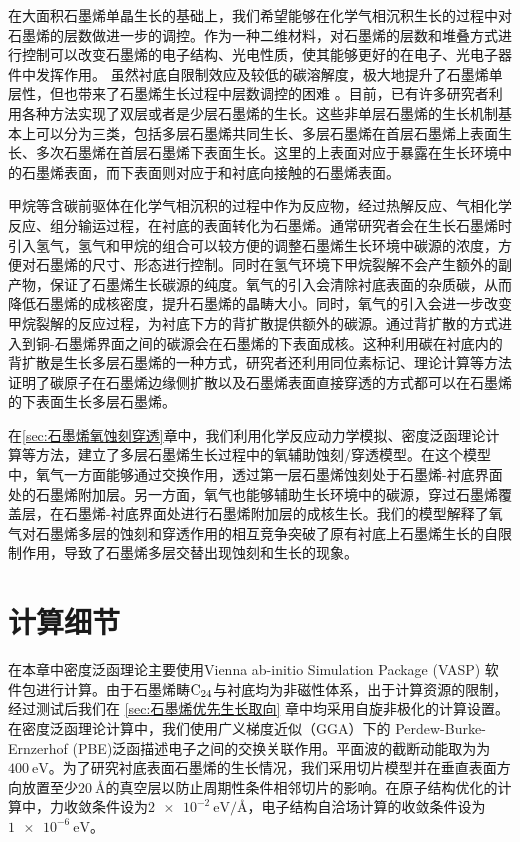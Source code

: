 在大面积石墨烯单晶生长的基础上，我们希望能够在化学气相沉积生长的过程中对石墨烯的层数做进一步的调控。作为一种二维材料，对石墨烯的层数和堆叠方式进行控制可以改变石墨烯的电子结构、光电性质，使其能够更好的在电子、光电子器件中发挥作用。
虽然衬底自限制效应及较低的碳溶解度，极大地提升了石墨烯单层性，但也带来了石墨烯生长过程中层数调控的困难 。目前，已有许多研究者利用各种方法实现了双层或者是少层石墨烯的生长。这些非单层石墨烯的生长机制基本上可以分为三类，包括多层石墨烯共同生长、多层石墨烯在首层石墨烯上表面生长、多次石墨烯在首层石墨烯下表面生长。这里的上表面对应于暴露在生长环境中的石墨烯表面，而下表面则对应于和衬底向接触的石墨烯表面。

甲烷等含碳前驱体在化学气相沉积的过程中作为反应物，经过热解反应、气相化学反应、组分输运过程，在衬底的表面转化为石墨烯。通常研究者会在生长石墨烯时引入氢气，氢气和甲烷的组合可以较方便的调整石墨烯生长环境中碳源的浓度，方便对石墨烯的尺寸、形态进行控制。同时在氢气环境下甲烷裂解不会产生额外的副产物，保证了石墨烯生长碳源的纯度。氧气的引入会清除衬底表面的杂质碳，从而降低石墨烯的成核密度，提升石墨烯的晶畴大小。同时，氧气的引入会进一步改变甲烷裂解的反应过程，为衬底下方的背扩散提供额外的碳源。通过背扩散的方式进入到铜-石墨烯界面之间的碳源会在石墨烯的下表面成核。这种利用碳在衬底内的背扩散是生长多层石墨烯的一种方式，研究者还利用同位素标记、理论计算等方法证明了碳原子在石墨烯边缘侧扩散以及石墨烯表面直接穿透的方式都可以在石墨烯的下表面生长多层石墨烯。

在\ref{sec:石墨烯氧蚀刻穿透}章中，我们利用化学反应动力学模拟、密度泛函理论计算等方法，建立了多层石墨烯生长过程中的氧辅助蚀刻/穿透模型。在这个模型中，氧气一方面能够通过交换作用，透过第一层石墨烯蚀刻处于石墨烯-衬底界面处的石墨烯附加层。另一方面，氧气也能够辅助生长环境中的碳源，穿过石墨烯覆盖层，在石墨烯-衬底界面处进行石墨烯附加层的成核生长。我们的模型解释了氧气对石墨烯多层的蚀刻和穿透作用的相互竞争突破了原有衬底上石墨烯生长的自限制作用，导致了石墨烯多层交替出现蚀刻和生长的现象。

\section{计算细节}

在本章中密度泛函理论主要使用Vienna ab-initio Simulation Package (VASP) 软件包进行计算。由于石墨烯畴$\rm{C_{24}}$与衬底均为非磁性体系，出于计算资源的限制，经过测试后我们在 \ref{sec:石墨烯优先生长取向} 章中均采用自旋非极化的计算设置。在密度泛函理论计算中，我们使用广义梯度近似（GGA）下的 Perdew-Burke-Ernzerhof (PBE)泛函描述电子之间的交换关联作用。平面波的截断动能取为为$\SI{400}{\electronvolt}$。为了研究衬底表面石墨烯的生长情况，我们采用切片模型并在垂直表面方向放置至少$\SI{20}{\angstrom}$的真空层以防止周期性条件相邻切片的影响。在原子结构优化的计算中，力收敛条件设为$\SI{2e-2}{\electronvolt \per \angstrom}$，电子结构自洽场计算的收敛条件设为$\SI{1e-6}{\electronvolt}$。


